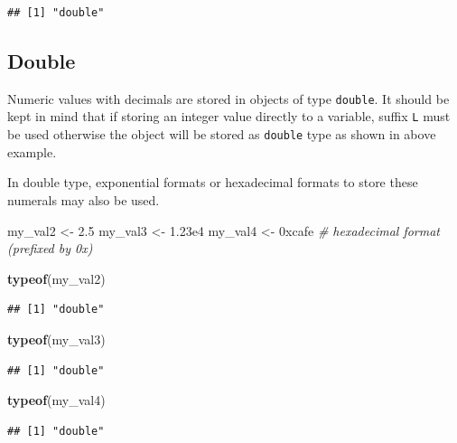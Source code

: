 \documentclass[
]{book}
\newenvironment{Shaded}{\begin{snugshade}}{\end{snugshade}}
\newcommand{\CommentTok}[1]{\textcolor[rgb]{0.56,0.35,0.01}{\textit{#1}}}
\newcommand{\DecValTok}[1]{\textcolor[rgb]{0.00,0.00,0.81}{#1}}
\newcommand{\FloatTok}[1]{\textcolor[rgb]{0.00,0.00,0.81}{#1}}
\newcommand{\FunctionTok}[1]{\textcolor[rgb]{0.13,0.29,0.53}{\textbf{#1}}}
\newcommand{\NormalTok}[1]{#1}
\newcommand{\OtherTok}[1]{\textcolor[rgb]{0.56,0.35,0.01}{#1}}
\begin{document}
\begin{verbatim}
## [1] "double"
\end{verbatim}

\hypertarget{double}{%
\subsection{Double}\label{double}}

Numeric values with decimals are stored in objects of type \texttt{double}. It should be kept in mind that if storing an integer value directly to a variable, suffix \texttt{L} must be used otherwise the object will be stored as \texttt{double} type as shown in above example.

In double type, exponential formats or hexadecimal formats to store these numerals may also be used.

\begin{Shaded}
\begin{Highlighting}[]
\NormalTok{my\_val2 }\OtherTok{\textless{}{-}} \FloatTok{2.5}
\NormalTok{my\_val3 }\OtherTok{\textless{}{-}} \FloatTok{1.23e4}
\NormalTok{my\_val4 }\OtherTok{\textless{}{-}} \DecValTok{0xcafe} \CommentTok{\# hexadecimal format (prefixed by 0x)}

\FunctionTok{typeof}\NormalTok{(my\_val2)}
\end{Highlighting}
\end{Shaded}

\begin{verbatim}
## [1] "double"
\end{verbatim}

\begin{Shaded}
\begin{Highlighting}[]
\FunctionTok{typeof}\NormalTok{(my\_val3)}
\end{Highlighting}
\end{Shaded}

\begin{verbatim}
## [1] "double"
\end{verbatim}

\begin{Shaded}
\begin{Highlighting}[]
\FunctionTok{typeof}\NormalTok{(my\_val4)}
\end{Highlighting}
\end{Shaded}

\begin{verbatim}
## [1] "double"
\end{verbatim}
\end{document}
